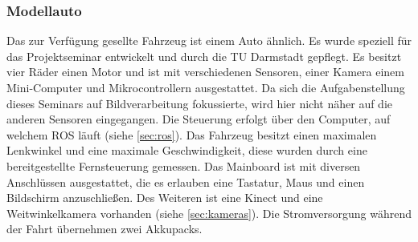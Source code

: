 \subsubsection{Modellauto}
\label{sec:modellauto}
Das zur Verfügung gesellte Fahrzeug ist einem Auto ähnlich. Es wurde speziell für das Projektseminar entwickelt und durch die TU Darmstadt gepflegt. Es besitzt vier Räder einen Motor und ist mit verschiedenen Sensoren, einer Kamera einem Mini-Computer und Mikrocontrollern ausgestattet. Da sich die Aufgabenstellung dieses Seminars auf Bildverarbeitung fokussierte, wird hier nicht näher auf die anderen Sensoren eingegangen. 
Die Steuerung erfolgt über den Computer, auf welchem ROS läuft (siehe \autoref{sec:ros}). Das Fahrzeug besitzt einen maximalen Lenkwinkel und eine maximale Geschwindigkeit, diese wurden durch eine bereitgestellte Fernsteuerung gemessen.
Das Mainboard ist mit diversen Anschlüssen ausgestattet, die es erlauben eine Tastatur, Maus und einen Bildschirm anzuschließen. Des Weiteren ist eine Kinect und eine Weitwinkelkamera vorhanden (siehe \autoref{sec:kameras}). Die Stromversorgung während der Fahrt übernehmen zwei Akkupacks.
